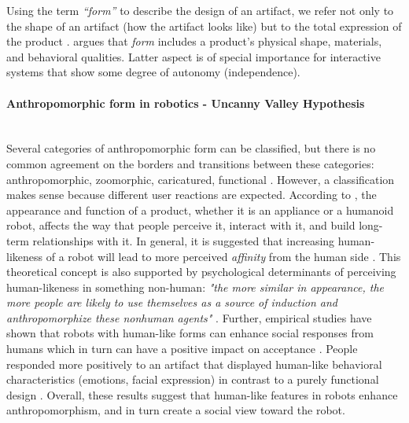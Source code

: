 \documentclass{frontiersSCNS} %
\begin{document}
Using the term \textit{``form''} to describe the design of an artifact, we refer not only to the shape of an artifact (how the artifact looks like) but to the total expression of the product \citep{bartneck_shaping_2004}. \cite{disalvo_hug:_2003} argues that \textit{form} includes a product's physical shape, materials, and behavioral qualities. Latter aspect is of special importance for interactive systems that show some degree of autonomy (independence).


\paragraph*{Anthropomorphic form in robotics - Uncanny Valley Hypothesis\\ \\}

Several categories of anthropomorphic form can be classified, but there is no common agreement on the borders and transitions between these categories: anthropomorphic, zoomorphic, caricatured, functional \citep{fong_survey_2003}. However, a classification makes sense because different user reactions are expected. According to \cite{bartneck_shaping_2004}, the appearance and function of a product, whether it is an appliance or a humanoid robot, affects the way that people perceive it, interact with it, and build long-term relationships with it. In general, it is suggested that increasing human-likeness of a robot will lead to more perceived \textit{affinity} from the human side \citep{mori_uncanny_1970}. This theoretical concept is also supported by psychological determinants of perceiving human-likeness in something non-human: \textit{"the more similar in appearance, the more people are likely to use themselves as a source of induction and anthropomorphize these nonhuman agents"} \citep{epley_seeing_2007}. Further, empirical studies have shown that robots with human-like forms can enhance social responses from humans which in turn can have a positive impact on acceptance \citep{duffy_anthropomorphism_2003,goetz_cooperation_2002,venkatesh_theoretical_2000}. People responded more positively to an artifact that displayed human-like behavioral characteristics (emotions, facial expression) in contrast to a purely functional design \citep{eyssel_anthropomorphic_2010,krach_can_2008,reeves_media_1996,riek_how_2009}. Overall, these results suggest that human-like features in robots enhance anthropomorphism, and in turn create a social view toward the robot.
\end{document}
